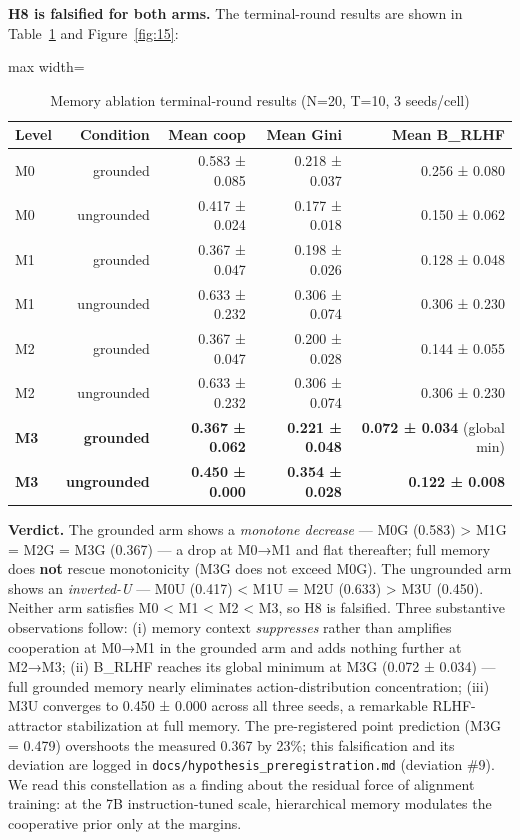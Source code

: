 \textbf{H8 is falsified for both arms.} The terminal-round results are shown in Table~\ref{tab:9} and Figure~\ref{fig:15}:


\begin{table}[H]
\centering
\caption{Memory ablation terminal-round results (N=20, T=10, 3 seeds/cell)}
\label{tab:9}
\footnotesize
\begin{adjustbox}{max width=\textwidth}
\begin{tabular}{lrrrr}
\toprule
Level & Condition & Mean coop & Mean Gini & Mean B\_RLHF \\
\midrule
M0 & grounded & 0.583 ± 0.085 & 0.218 ± 0.037 & 0.256 ± 0.080 \\
M0 & ungrounded & 0.417 ± 0.024 & 0.177 ± 0.018 & 0.150 ± 0.062 \\
M1 & grounded & 0.367 ± 0.047 & 0.198 ± 0.026 & 0.128 ± 0.048 \\
M1 & ungrounded & 0.633 ± 0.232 & 0.306 ± 0.074 & 0.306 ± 0.230 \\
M2 & grounded & 0.367 ± 0.047 & 0.200 ± 0.028 & 0.144 ± 0.055 \\
M2 & ungrounded & 0.633 ± 0.232 & 0.306 ± 0.074 & 0.306 ± 0.230 \\
\textbf{M3} & \textbf{grounded} & \textbf{0.367 ± 0.062} & \textbf{0.221 ± 0.048} & \textbf{0.072 ± 0.034} (global min) \\
\textbf{M3} & \textbf{ungrounded} & \textbf{0.450 ± 0.000} & \textbf{0.354 ± 0.028} & \textbf{0.122 ± 0.008} \\
\bottomrule
\end{tabular}
\end{adjustbox}
\end{table}

\textbf{Verdict.} The grounded arm shows a \textit{monotone decrease} — M0G (0.583) > M1G = M2G = M3G (0.367) — a drop at M0→M1 and flat thereafter; full memory does \textbf{not} rescue monotonicity (M3G does not exceed M0G). The ungrounded arm shows an \textit{inverted-U} — M0U (0.417) < M1U = M2U (0.633) > M3U (0.450). Neither arm satisfies M0 < M1 < M2 < M3, so H8 is falsified. Three substantive observations follow: (i) memory context \textit{suppresses} rather than amplifies cooperation at M0→M1 in the grounded arm and adds nothing further at M2→M3; (ii) B\_RLHF reaches its global minimum at M3G (0.072 ± 0.034) — full grounded memory nearly eliminates action-distribution concentration; (iii) M3U converges to 0.450 ± 0.000 across all three seeds, a remarkable RLHF-attractor stabilization at full memory. The pre-registered point prediction (M3G = 0.479) overshoots the measured 0.367 by 23\%; this falsification and its deviation are logged in \texttt{docs/hypothesis\_preregistration.md} (deviation \#9). We read this constellation as a finding about the residual force of alignment training: at the 7B instruction-tuned scale, hierarchical memory modulates the cooperative prior only at the margins.

